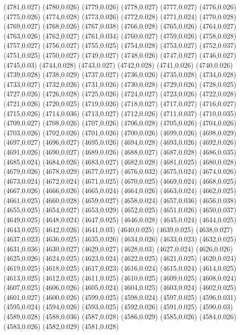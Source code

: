 (4781,0.027)
(4780,0.026)
(4779,0.026)
(4778,0.027)
(4777,0.027)
(4776,0.026)
(4775,0.026)
(4774,0.028)
(4773,0.026)
(4772,0.028)
(4771,0.024)
(4770,0.028)
(4769,0.027)
(4768,0.026)
(4767,0.038)
(4766,0.028)
(4765,0.026)
(4764,0.027)
(4763,0.026)
(4762,0.027)
(4761,0.034)
(4760,0.027)
(4759,0.026)
(4758,0.028)
(4757,0.027)
(4756,0.027)
(4755,0.025)
(4754,0.028)
(4753,0.027)
(4752,0.037)
(4751,0.025)
(4750,0.027)
(4749,0.027)
(4748,0.026)
(4747,0.027)
(4746,0.027)
(4745,0.03)
(4744,0.028)
(4743,0.027)
(4742,0.028)
(4741,0.026)
(4740,0.026)
(4739,0.028)
(4738,0.029)
(4737,0.027)
(4736,0.026)
(4735,0.028)
(4734,0.028)
(4733,0.027)
(4732,0.026)
(4731,0.026)
(4730,0.028)
(4729,0.026)
(4728,0.025)
(4727,0.026)
(4726,0.028)
(4725,0.026)
(4724,0.027)
(4723,0.026)
(4722,0.028)
(4721,0.026)
(4720,0.025)
(4719,0.026)
(4718,0.027)
(4717,0.027)
(4716,0.027)
(4715,0.026)
(4714,0.036)
(4713,0.027)
(4712,0.026)
(4711,0.037)
(4710,0.035)
(4709,0.027)
(4708,0.026)
(4707,0.026)
(4706,0.028)
(4705,0.026)
(4704,0.026)
(4703,0.026)
(4702,0.026)
(4701,0.026)
(4700,0.026)
(4699,0.026)
(4698,0.029)
(4697,0.027)
(4696,0.027)
(4695,0.026)
(4694,0.028)
(4693,0.026)
(4692,0.026)
(4691,0.026)
(4690,0.027)
(4689,0.026)
(4688,0.027)
(4687,0.028)
(4686,0.035)
(4685,0.024)
(4684,0.026)
(4683,0.027)
(4682,0.028)
(4681,0.025)
(4680,0.028)
(4679,0.026)
(4678,0.029)
(4677,0.027)
(4676,0.032)
(4675,0.024)
(4674,0.026)
(4673,0.024)
(4672,0.024)
(4671,0.025)
(4670,0.025)
(4669,0.024)
(4668,0.025)
(4667,0.026)
(4666,0.026)
(4665,0.024)
(4664,0.026)
(4663,0.024)
(4662,0.025)
(4661,0.025)
(4660,0.028)
(4659,0.027)
(4658,0.024)
(4657,0.036)
(4656,0.038)
(4655,0.025)
(4654,0.027)
(4653,0.029)
(4652,0.025)
(4651,0.026)
(4650,0.037)
(4649,0.025)
(4648,0.024)
(4647,0.025)
(4646,0.028)
(4645,0.024)
(4644,0.025)
(4643,0.025)
(4642,0.026)
(4641,0.03)
(4640,0.025)
(4639,0.025)
(4638,0.027)
(4637,0.023)
(4636,0.025)
(4635,0.026)
(4634,0.026)
(4633,0.023)
(4632,0.025)
(4631,0.036)
(4630,0.027)
(4629,0.027)
(4628,0.03)
(4627,0.024)
(4626,0.026)
(4625,0.026)
(4624,0.025)
(4623,0.024)
(4622,0.025)
(4621,0.025)
(4620,0.024)
(4619,0.025)
(4618,0.025)
(4617,0.023)
(4616,0.024)
(4615,0.024)
(4614,0.025)
(4613,0.025)
(4612,0.025)
(4611,0.025)
(4610,0.025)
(4609,0.025)
(4608,0.024)
(4607,0.025)
(4606,0.026)
(4605,0.024)
(4604,0.025)
(4603,0.024)
(4602,0.025)
(4601,0.027)
(4600,0.026)
(4599,0.025)
(4598,0.024)
(4597,0.025)
(4596,0.031)
(4595,0.024)
(4594,0.026)
(4593,0.025)
(4592,0.026)
(4591,0.025)
(4590,0.03)
(4589,0.028)
(4588,0.036)
(4587,0.028)
(4586,0.029)
(4585,0.026)
(4584,0.026)
(4583,0.026)
(4582,0.029)
(4581,0.028)
